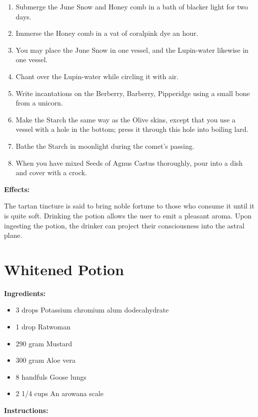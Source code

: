 \documentclass{article}
\begin{document}
\begin{enumerate}
  \item Submerge the June Snow and Honey comb in a bath of blacker light for two days.
  \item Immerse the Honey comb in a vat of coralpink dye an hour.
  \item You may place the June Snow in one vessel, and the Lupin-water likewise in one vessel.
  \item Chant over the Lupin-water while circling it with air.
  \item Write incantations on the Berberry, Barberry, Pipperidge using a small bone from a unicorn.
  \item Make the Starch the same way as the Olive skins, except that you use a vessel with a hole in the bottom; press it through this hole into boiling lard.
  \item Bathe the Starch in moonlight during the comet’s passing.
  \item When you have mixed Seeds of Agnus Castus thoroughly, pour into a dish and cover with a crock.
\end{enumerate}

\textbf{Effects:}

The tartan tincture is said to bring noble fortune to those who consume it until it is quite soft. Drinking the potion allows the user to emit a pleasant aroma. Upon ingesting the potion, the drinker can project their consciousness into the astral plane.

\newpage
\section*{Whitened Potion}

\textbf{Ingredients:}

\begin{itemize}
  \item 3 drops Potassium chromium alum dodecahydrate
  \item 1 drop Ratwoman
  \item 290 gram Mustard
  \item 300 gram Aloe vera
  \item 8 handfuls Goose lungs
  \item 2 1/4 cups An arowana scale
\end{itemize}

\textbf{Instructions:}
\end{document}
